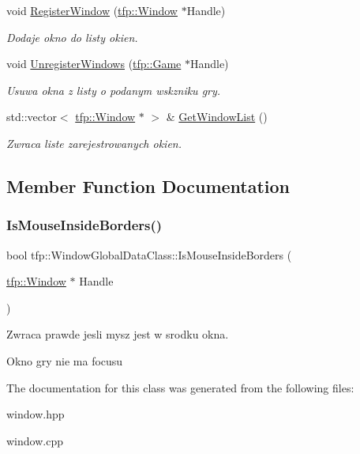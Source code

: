 \begin{DoxyCompactItemize}
void \mbox{\hyperlink{classtfp_1_1_window_global_data_class_a7251a03b6e6f762a18e79f14c162da2c}{Register\+Window}} (\mbox{\hyperlink{classtfp_1_1_window}{tfp\+::\+Window}} $\ast$Handle)
\begin{DoxyCompactList}\small\item\em Dodaje okno do listy okien. \end{DoxyCompactList}\item 
\mbox{\label{classtfp_1_1_window_global_data_class_a7be95ee9f8ad5e457a11329fcd37ab73}} 
void \mbox{\hyperlink{classtfp_1_1_window_global_data_class_a7be95ee9f8ad5e457a11329fcd37ab73}{Unregister\+Windows}} (\mbox{\hyperlink{classtfp_1_1_game}{tfp\+::\+Game}} $\ast$Handle)
\begin{DoxyCompactList}\small\item\em Usuwa okna z listy o podanym wskzniku gry. \end{DoxyCompactList}\item 
\mbox{\label{classtfp_1_1_window_global_data_class_ab1c2cbe3d08b46eb6b780a5ac56ddd86}} 
std\+::vector$<$ \mbox{\hyperlink{classtfp_1_1_window}{tfp\+::\+Window}} $\ast$ $>$ \& \mbox{\hyperlink{classtfp_1_1_window_global_data_class_ab1c2cbe3d08b46eb6b780a5ac56ddd86}{Get\+Window\+List}} ()
\begin{DoxyCompactList}\small\item\em Zwraca liste zarejestrowanych okien. \end{DoxyCompactList}\end{DoxyCompactItemize}


\subsection{Member Function Documentation}
\mbox{\label{classtfp_1_1_window_global_data_class_ad365639c8a2cbaf542e251dfdcca8ab8}} 
\subsubsection{\texorpdfstring{Is\+Mouse\+Inside\+Borders()}{IsMouseInsideBorders()}}
{\footnotesize\ttfamily bool tfp\+::\+Window\+Global\+Data\+Class\+::\+Is\+Mouse\+Inside\+Borders (\begin{DoxyParamCaption}\item[{\mbox{\hyperlink{classtfp_1_1_window}{tfp\+::\+Window}} $\ast$}]{Handle }\end{DoxyParamCaption})}



Zwraca prawde jesli mysz jest w srodku okna. 

Okno gry nie ma focusu 

The documentation for this class was generated from the following files\+:\begin{DoxyCompactItemize}
\item 
window.\+hpp\item 
window.\+cpp\end{DoxyCompactItemize}
